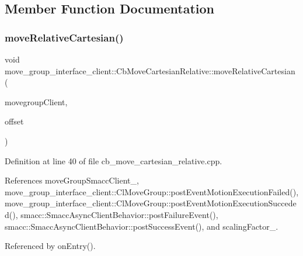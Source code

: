\subsection{Member Function Documentation}
\mbox{\label{classmove__group__interface__client_1_1CbMoveCartesianRelative_a85b6b1c8738c372174dff8fd98ec1b7a}} 
\subsubsection{\texorpdfstring{move\+Relative\+Cartesian()}{moveRelativeCartesian()}}
{\footnotesize\ttfamily void move\+\_\+group\+\_\+interface\+\_\+client\+::\+Cb\+Move\+Cartesian\+Relative\+::move\+Relative\+Cartesian (\begin{DoxyParamCaption}\item[{moveit\+::planning\+\_\+interface\+::\+Move\+Group\+Interface $\ast$}]{movegroup\+Client,  }\item[{geometry\+\_\+msgs\+::\+Vector3 \&}]{offset }\end{DoxyParamCaption})}



Definition at line 40 of file cb\+\_\+move\+\_\+cartesian\+\_\+relative.\+cpp.



References move\+Group\+Smacc\+Client\+\_\+, move\+\_\+group\+\_\+interface\+\_\+client\+::\+Cl\+Move\+Group\+::post\+Event\+Motion\+Execution\+Failed(), move\+\_\+group\+\_\+interface\+\_\+client\+::\+Cl\+Move\+Group\+::post\+Event\+Motion\+Execution\+Succeded(), smacc\+::\+Smacc\+Async\+Client\+Behavior\+::post\+Failure\+Event(), smacc\+::\+Smacc\+Async\+Client\+Behavior\+::post\+Success\+Event(), and scaling\+Factor\+\_\+.



Referenced by on\+Entry().


